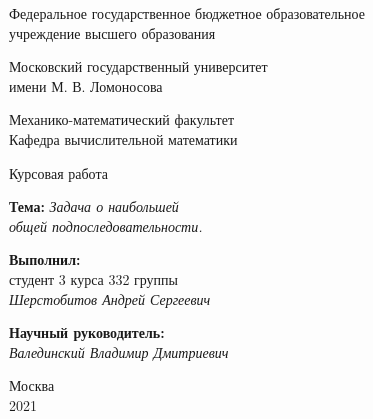 \documentclass[12pt]{article}
\begin{document}
\begin{titlepage}
        
    \begin{center}
    \large{Федеральное государственное бюджетное образовательное\\
    учреждение высшего образования\\}
                
    Московский государственный университет\\
    имени М. В. Ломоносова\\
    
    \vspace{0.25 cm}
    
    \normalsize{Механико-математический факультет\\}
    \vspace{0.5 cm}
    Кафедра вычислительной математики\\
    \end{center}
    
    \vspace{3cm}
    
    \begin{center}
    \LARGE{Курсовая работа}\\
            
    \vspace{0.5 cm}
    
    \normalsize{}
    \textbf{Тема:} \textit{Задача о наибольшей\\общей подпоследовательности.}
    \end{center}
    
    \vspace{3 cm}
    
    \begin{flushright}
    \textbf{Выполнил:}\\
    студент 3 курса
    332 группы\\
    
    \textit{Шерстобитов Андрей Сергеевич}\\
    
    \vspace{1 cm}
    
    \textbf{Научный руководитель:}\\
    
    \textit{Валединский Владимир Дмитриевич}
    \end{flushright}
            
    \vspace{\fill}
    \normalsize{}
    \begin{center}
    Москва\\2021
    \end{center}
    
    \thispagestyle{empty}
    \end{titlepage}
    \newpage
\tableofcontents
    \newpage
\end{document}
